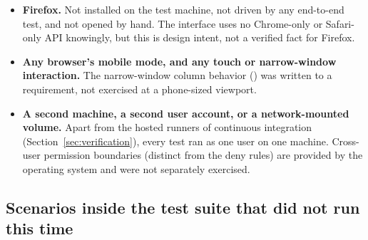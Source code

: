 \begin{itemize}
        run anything but continuous integration.  Quick
        Look previews do not exist on Linux.
  \item \textbf{Firefox.}  Not installed on the test machine, not driven by any
        end-to-end test, and not opened by hand.  The interface uses no
        Chrome-only or Safari-only API knowingly, but this is design intent, not a
        verified fact for Firefox.
  \item \textbf{Any browser's mobile mode, and any touch or narrow-window
        interaction.}  The narrow-window column behavior () was written to
        a requirement, not exercised at a phone-sized viewport.
  \item \textbf{A second machine, a second user account, or a network-mounted
        volume.}  Apart from the hosted runners of continuous integration (Section~\ref{sec:verification}), every test ran as one user on one machine.  Cross-user permission
        boundaries (distinct from the deny rules) are provided by the operating system
        and were not separately exercised.
\end{itemize}

\subsection{Scenarios inside the test suite that did not run this time}

